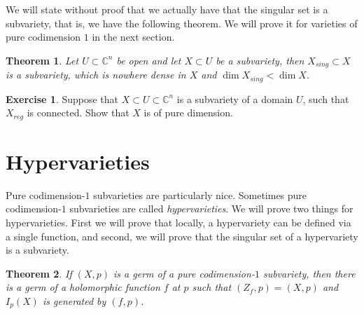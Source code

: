 \documentclass[12pt,openany]{book}
\newcommand{\C}{{\mathbb{C}}}
\theoremstyle{plain}
\newtheorem{thm}{Theorem}[section]
\theoremstyle{remark}
\theoremstyle{definition}
\newenvironment{exbox}{%
    \def\FrameCommand{\vrule width 1pt \relax\hspace{10pt}}%
    \MakeFramed{\advance\hsize-\width\FrameRestore}%
}{%
    \endMakeFramed
}
\theoremstyle{exercise}
\newtheorem{exercise}{Exercise}[section]
\theoremstyle{example}
\begin{document}
We will state without proof that we actually have that the singular set is a
subvariety, that is, we have the following theorem.
We will prove it for varieties of pure codimension $1$
in the next section.

\begin{thm} \label{thm:varietysingularity}
Let $U \subset \C^n$ be open and let $X \subset U$
be a subvariety, then
$X_{\mathit{sing}} \subset X$ is a subvariety,
which is nowhere dense in $X$
and $\dim X_{\mathit{sing}} < \dim X$.
\end{thm}

\begin{exbox}
\begin{exercise}
Suppose that $X \subset U \subset \C^n$ is a subvariety
of a domain $U$, such that $X_{\mathit{reg}}$ is connected.  Show that $X$ is of
pure dimension.
\end{exercise}
\end{exbox}


\section{Hypervarieties} \label{section:hypervarieties}

Pure codimension-$1$ subvarieties are particularly nice.
Sometimes pure codimension-$1$ subvarieties are called
\emph{hypervarieties}.  We will prove two things for
hypervarieties.  First we will prove that locally, a hypervariety can be
defined via a single function,
and second, we will prove that the singular set of a hypervariety is a
subvariety.

\begin{thm} \label{thm:codim1var}
\pagebreak[0]
If $(X,p)$ is a germ of a pure codimension-$1$ subvariety, then
there is a germ of a holomorphic function $f$ at $p$
such that $(Z_f,p) = (X,p)$ and $I_p(X)$ is generated by $(f,p)$.
\end{thm}
\end{document}
